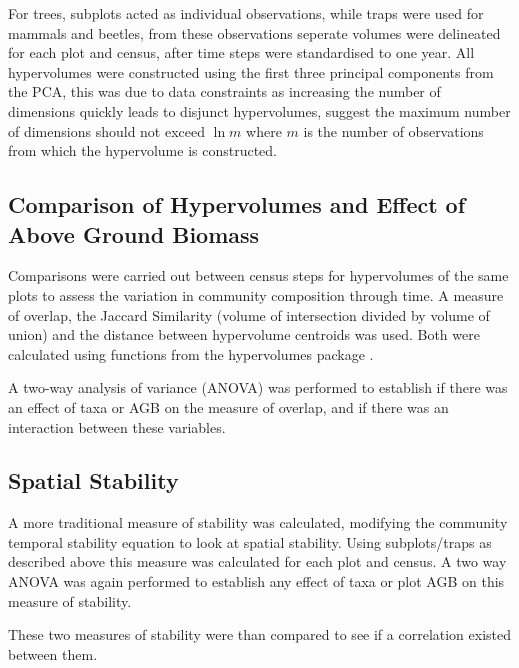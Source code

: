 	For trees, subplots acted as individual observations, while traps were used for mammals and beetles, from these observations seperate volumes were delineated for each plot and census, after time steps were standardised to one year. All hypervolumes were constructed using the first three principal components from the PCA, this was due to data constraints as increasing the number of dimensions quickly leads to disjunct hypervolumes, \cite{Blonder2017b} suggest the maximum number of dimensions should not exceed $\ln m$ where $m$ is the number of observations from which the hypervolume is constructed.

\subsection{Comparison of Hypervolumes and Effect of Above Ground Biomass}

Comparisons were carried out between census steps for hypervolumes of the same plots to assess the variation in community composition through time. A measure of overlap, the Jaccard Similarity (volume of intersection divided by volume of union) and the distance between hypervolume centroids was used. Both were calculated using functions from the hypervolumes package \citep{Blonder2017a}.

A two-way analysis of variance (ANOVA) was performed to establish if there was an effect of taxa or AGB on the measure of overlap, and if there was an interaction between these variables.


\subsection{Spatial Stability}
A more traditional measure of stability was calculated, modifying the community temporal stability equation to look at spatial stability. Using subplots/traps as described above this measure was calculated for each plot and census. A two way ANOVA was again performed to  establish any effect of taxa or plot AGB on this measure of stability. 

These two measures of stability were than compared to see if a correlation existed between them.
